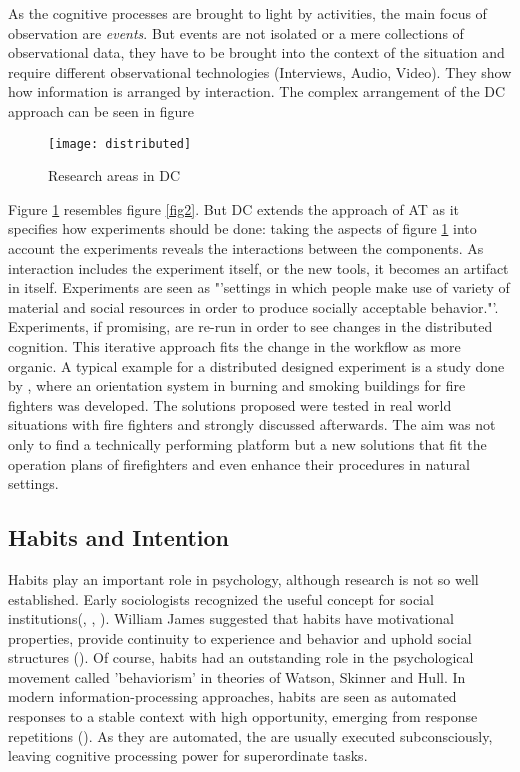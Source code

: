 As the cognitive processes are brought to light by activities, the main focus of observation are \textit{events}. But events are not isolated or a mere collections of observational data, they have to be brought into the context of the situation and require different observational technologies (Interviews, Audio, Video). They show how information is arranged by interaction. The complex arrangement of the \ac{DC} approach can be seen in figure

\begin{figure}[ht]
	\centering
  \texttt{[image: distributed]}
	\caption{Research areas in \ac{DC}}
	\label{fig4}
\end{figure}

Figure \ref{fig4} resembles figure \ref{fig2}. But \ac{DC} extends the approach of \ac{AT} as it specifies how experiments should be done: taking the aspects of figure \ref{fig4} into account the experiments reveals the interactions between the components. As interaction includes the experiment itself, or the new tools, it becomes an artifact in itself. Experiments are seen as "'settings in which people make use of variety of material and social resources in order to produce socially acceptable behavior."'. Experiments, if promising, are re-run in order to see changes in the distributed cognition. This iterative approach fits the change in the workflow as more organic. A typical example for a distributed designed experiment is a study done by \cite{denef2008handy}, where an orientation system in burning and smoking buildings for fire fighters was developed. The solutions proposed were tested in real world situations with fire fighters and strongly discussed afterwards. The aim was not only to find a technically performing platform but a new solutions that fit the operation plans of firefighters and even enhance their procedures in natural settings.

\subsection{Habits and Intention}
\label{habits}
Habits play an important role in psychology, although research is not so well established. Early sociologists recognized the useful concept for social institutions(\cite{weber1946social}, \cite{mead2007movements}, \cite{durkheim1933division}). William James suggested that habits have motivational properties, provide continuity to experience and behavior and uphold social structures (\cite{james2011principles}). Of course, habits had an outstanding role in the psychological movement called 'behaviorism' in theories of Watson, Skinner and Hull\cite{ouellette1998habit}. In modern information-processing approaches, habits are seen as automated responses to a stable context with high opportunity, emerging from response repetitions (\cite{ronis1989attitudes}). As they are automated, the are usually executed subconsciously, leaving cognitive processing power for superordinate tasks. 

